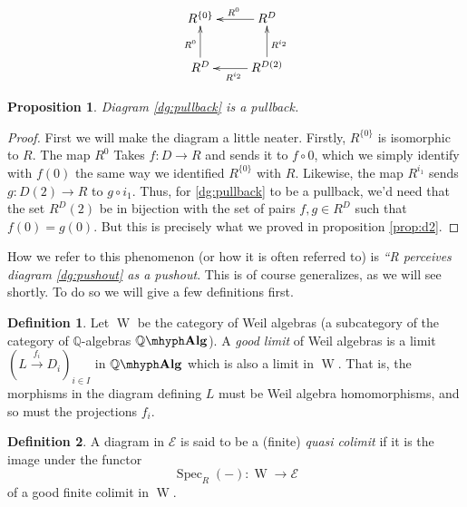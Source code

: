 \documentclass[11pt]{article}
\newtheorem{proposition}{Proposition}[section]
\theoremstyle{definition}
\newtheorem{defn}{Definition}[section]
\newcommand{\farg}{-} %
\newcommand{\sdgE}{\mathcal{E}}
\newcommand{\Q}{\mathbb{Q}}
\newcommand{\qalg}{\Q\mhyph\mathbf{Alg}}
\newcommand{\walg}{\operatorname W}
\DeclareMathOperator{\spec}{Spec}
\numberwithin{equation}{section}
\begin{document}
\begin{equation*}
  \xymatrix{
    R^{\{0\}}       & R^D \ar[l]_{R^0}                           \\
    R^D \ar[u]^{R^0} & R^{D(2)} \ar[u]_{R^{i_2}} \ar[l]^{R^{i_2}} 
  }
  \label{dg:pullback}
\end{equation*}

\begin{proposition}
  Diagram \ref{dg:pullback} is a pullback.
  \label{prop:pullback}
\end{proposition}

\begin{proof}
  First we will make the diagram a little neater. Firstly, \( R^{\{0\}} \) is isomorphic to \( R \). The map \( R^0 \) Takes \( f:D\to R \) and sends it to \( f\circ 0 \), which we simply identify with \( f(0) \) the same way we identified \( R^{\{0\}} \) with \( R \). Likewise, the map \( R^{i_1} \) sends \( g:D(2)\to R \) to \( g\circ i_1 \). Thus, for \ref{dg:pullback} to be a pullback, we'd need that the set \( R^D(2) \) be in bijection with the set of pairs \( f,g\in R^D \) such that \( f(0)=g(0) \). But this is precisely what we proved in proposition \ref{prop:d2}.
\end{proof}

How we refer to this phenomenon (or how it is often referred to) is \emph{``R perceives diagram \ref{dg:pushout} as a pushout}. This is of course generalizes, as we will see shortly. To do so we will give a few definitions first.

\begin{defn}
  Let \( \walg \) be the category of Weil algebras (a subcategory of the category of \( \Q \)-algebras \( \qalg \)). A \emph{good limit} of Weil algebras is a limit \( \left(L\stackrel{f_i}{\longrightarrow}D_i\right)_{i\in I} \) in \( \qalg \) which is also a limit in \( \walg \). That is, the morphisms in the diagram defining \( L \) must be Weil algebra homomorphisms, and so must the projections \( f_i \).
\end{defn}

\begin{defn}
  A diagram in \( \sdgE \) is said to be a (finite) \emph{quasi colimit} if it is the image under the functor
  \begin{equation*}
    \spec_R(\farg):\walg\to\sdgE
  \end{equation*}
  of a good finite colimit in \( \walg \).
\end{defn}
\end{document}
